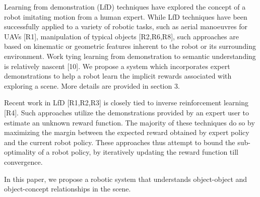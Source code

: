 Learning from demonstration (LfD) techniques have explored the concept of a robot imitating motion from a human expert. While LfD techniques have been successfully applied to a variety of robotic tasks, such as aerial manoeuvres for UAVs [R1], manipulation of typical objects [R2,R6,R8], such approaches are based on kinematic or geometric features inherent to the robot or its surrounding environment. Work tying learning from demonstration to semantic understanding is relatively nascent [10]. We propose a system which incorporates expert demonstrations to help a robot learn the implicit rewards associated with exploring a scene. More details are provided in section 3. 

Recent work in LfD [R1,R2,R3] is closely tied to inverse reinforcement learning [R4]. Such approaches utilize the demonstrations provided by an expert user to estimate an unknown reward function. The majority of these techniques do so by maximizing the margin between the expected reward obtained by expert policy and the current robot policy. These approaches thus attempt to bound the sub-optimality of a robot policy, by iteratively updating the reward function till convergence.


In this paper, we propose a robotic system that understands object-object and object-concept relationships in the scene. %


